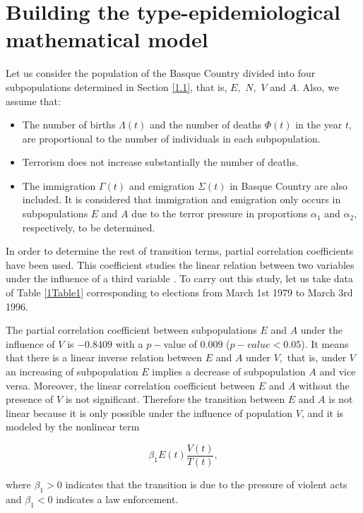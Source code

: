 \section{Building the type-epidemiological mathematical model}\label{1.2}

Let us consider the population of the Basque Country divided into four
subpopulations determined in Section \ref{1.1}, that is, $E,$ $N,$ 
$V$ and $A$. Also, we assume that:

\begin{itemize}
\item The number of births $\Lambda(t)$ and the number of
deaths $\Phi(t)$ in the year $t$, are proportional to the number of individuals
in each subpopulation.

\item Terrorism does not increase substantially the number of deaths. 

\item The immigration $\Gamma(t)$ and emigration $\Sigma(t)$ in Basque Country 
are also included. It is considered that immigration and emigration only occurs 
in subpopulations $E$ and $A$ due to the terror pressure \cite{exilio2, exilio3, exilio1} 
in proportions $\alpha_{1}$ and $\alpha_{2}$, respectively, to be determined.
\end{itemize}

In order to determine the rest of transition terms, 
partial correlation coefficients have been used. This coefficient studies
the linear relation between two variables under the influence of a third
variable \cite{Groot}. To carry out this study, let us take data of Table
\ref{1Table1} corresponding to elections from March 1st 1979 to March 3rd
1996.

The partial correlation coefficient between subpopulations $E$ and $A$ under
the influence of $V$ is $-0.8409$ with a $p-$value of $0.009$ ($p-value < 0.05$). It means that
there is a linear inverse relation between $E$ and $A$ under $V,$ that is,
under $V$ an increasing of subpopulation $E$ implies a decrease of
subpopulation $A$ and vice versa. Moreover, the linear correlation
coefficient between $E$ and $A$ without the presence of $V$ is not
significant. Therefore the transition between $E$ and $A$ is not linear because it is only possible under the influence of population $V$, and it is modeled by the nonlinear term

\[
\beta_{1} E(t) \frac{V(t)}{T(t)}, 
\]

where $\beta_{1} > 0$ indicates that the transition is due to the pressure of
violent acts and $\beta_{1} < 0$ indicates a law enforcement.

